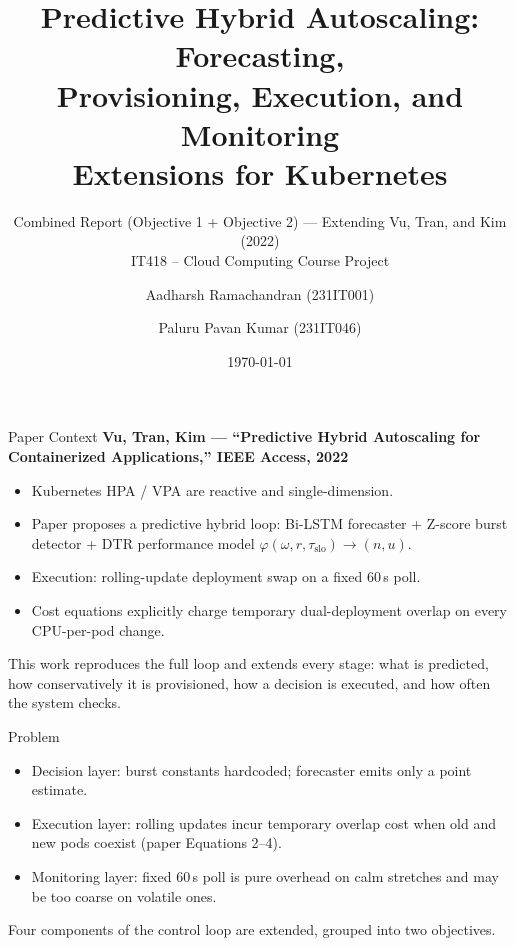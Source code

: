 \documentclass[aspectratio=169,10pt]{beamer}
\title[Forecasting, Provisioning, Execution \& Monitoring]{Predictive Hybrid Autoscaling: Forecasting,\\Provisioning, Execution, and Monitoring\\Extensions for Kubernetes}
\subtitle{Combined Report (Objective 1 + Objective 2) --- Extending Vu, Tran, and Kim (2022)\\IT418 -- Cloud Computing Course Project}
\author{Aadharsh Ramachandran (231IT001) \and Paluru Pavan Kumar (231IT046)}
\institute[NITK]{National Institute of Technology Karnataka}
\date{\today}
\begin{document}
\begin{frame}
\titlepage
\end{frame}

\begin{frame}{Paper Context}
\textbf{Vu, Tran, Kim --- ``Predictive Hybrid Autoscaling for Containerized Applications,'' IEEE Access, 2022}

\vspace{0.2cm}
\begin{itemize}
  \item Kubernetes HPA / VPA are reactive and single-dimension.
  \item Paper proposes a predictive hybrid loop: Bi-LSTM forecaster + Z-score burst detector + DTR performance model $\varphi(\omega,r,\tau_{\text{slo}})\to(n,u)$.
  \item Execution: rolling-update deployment swap on a fixed 60\,s poll.
  \item Cost equations explicitly charge temporary dual-deployment overlap on every CPU-per-pod change.
\end{itemize}

\vspace{0.15cm}
This work reproduces the full loop and extends every stage: what is predicted, how conservatively it is provisioned, how a decision is executed, and how often the system checks.
\end{frame}

\begin{frame}{Problem}
\begin{itemize}
  \item Decision layer: burst constants hardcoded; forecaster emits only a point estimate.
  \item Execution layer: rolling updates incur temporary overlap cost when old and new pods coexist (paper Equations 2--4).
  \item Monitoring layer: fixed 60\,s poll is pure overhead on calm stretches and may be too coarse on volatile ones.
\end{itemize}

\vspace{0.25cm}
Four components of the control loop are extended, grouped into two objectives.
\end{frame}
\end{document}
